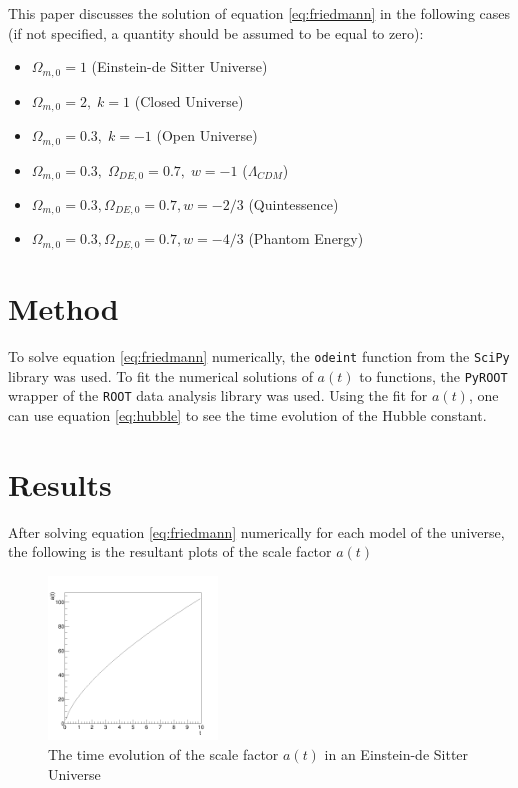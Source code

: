 \documentclass[aps,reprint,prl]{revtex4-1}
\begin{document}
This paper discusses the solution of equation \ref{eq:friedmann} in the following cases (if not specified, a quantity should be assumed to be equal to zero):
\begin{itemize}
\item $\Omega_{m,0}=1$ (Einstein-de Sitter Universe)
\item $\Omega_{m,0}=2,\;k=1$ (Closed Universe)
\item $\Omega_{m,0}=0.3,\;k=-1$ (Open Universe)
\item $\Omega_{m,0}=0.3,\;\Omega_{DE,0}=0.7,\;w=-1$ ($\Lambda_{CDM}$)
\item $\Omega_{m,0}=0.3,\Omega_{DE,0}=0.7,w=-2/3$ (Quintessence)
\item $\Omega_{m,0}=0.3,\Omega_{DE,0}=0.7,w=-4/3$ (Phantom Energy)
\end{itemize}
\section*{Method}
To solve equation \ref{eq:friedmann} numerically, the \texttt{odeint} function from the \texttt{SciPy} library \cite{scipy} was used.  To fit the numerical solutions of $a(t)$ to functions, the \texttt{PyROOT} wrapper of the \texttt{ROOT} data analysis library \cite{ROOT} was used.  Using the fit for $a(t)$, one can use equation \ref{eq:hubble} to see the time evolution of the Hubble constant.
\section*{Results}
After solving equation \ref{eq:friedmann} numerically for each model of the universe, the following is the resultant plots of the scale factor $a(t)$

\begin{figure}
\includegraphics[width=0.4\textwidth]{ps1_plots/a_einstein}
\caption{The time evolution of the scale factor $a(t)$ in an Einstein-de Sitter Universe}
\end{figure}
\end{document}
